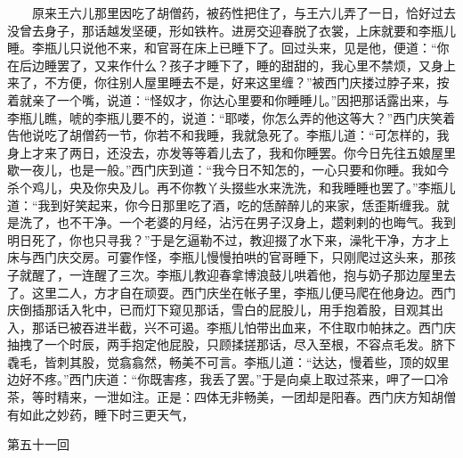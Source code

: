 　　原来王六儿那里因吃了胡僧药，被药性把住了，与王六儿弄了一日，恰好过去没曾去身子，那话越发坚硬，形如铁杵。进房交迎春脱了衣裳，上床就要和李瓶儿睡。李瓶儿只说他不来，和官哥在床上已睡下了。回过头来，见是他，便道：“你在后边睡罢了，又来作什么？孩子才睡下了，睡的甜甜的，我心里不禁烦，又身上来了，不方便，你往别人屋里睡去不是，好来这里缠？”被西门庆搂过脖子来，按着就亲了一个嘴，说道：“怪奴才，你达心里要和你睡睡儿。”因把那话露出来，与李瓶儿瞧，唬的李瓶儿要不的，说道：“耶喽，你怎么弄的他这等大？”西门庆笑着告他说吃了胡僧药一节，你若不和我睡，我就急死了。李瓶儿道：“可怎样的，我身上才来了两日，还没去，亦发等等着儿去了，我和你睡罢。你今日先往五娘屋里歇一夜儿，也是一般。”西门庆到道：“我今日不知怎的，一心只要和你睡。我如今杀个鸡儿，央及你央及儿。再不你教丫头掇些水来洗洗，和我睡睡也罢了。”李瓶儿道：“我到好笑起来，你今日那里吃了酒，吃的恁醉醉儿的来家，恁歪斯缠我。就是洗了，也不干净。一个老婆的月经，沾污在男子汉身上，趱剌剌的也晦气。我到明日死了，你也只寻我？”于是乞逼勒不过，教迎掇了水下来，澡牝干净，方才上床与西门庆交房。可霎作怪，李瓶儿慢慢拍哄的官哥睡下，只刚爬过这头来，那孩子就醒了，一连醒了三次。李瓶儿教迎春拿博浪鼓儿哄着他，抱与奶子那边屋里去了。这里二人，方才自在顽耍。西门庆坐在帐子里，李瓶儿便马爬在他身边。西门庆倒插那话入牝中，已而灯下窥见那话，雪白的屁股儿，用手抱着股，目观其出入，那话已被吞进半截，兴不可遏。李瓶儿怕带出血来，不住取巾帕抹之。西门庆抽拽了一个时辰，两手抱定他屁股，只顾揉搓那话，尽入至根，不容点毛发。脐下毳毛，皆刺其股，觉翕翕然，畅美不可言。李瓶儿道：“达达，慢着些，顶的奴里边好不疼。”西门庆道：“你既害疼，我丢了罢。”于是向桌上取过茶来，呷了一口冷茶，等时精来，一泄如注。正是：四体无非畅美，一团却是阳春。西门庆方知胡僧有如此之妙药，睡下时三更天气，


第五十一回

